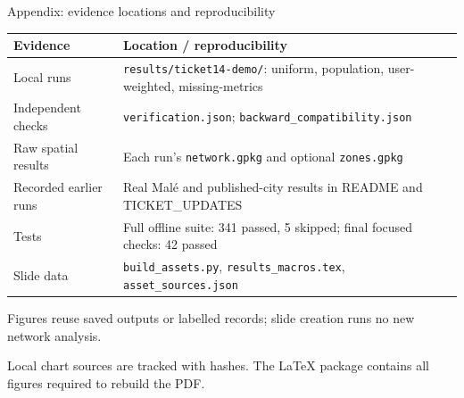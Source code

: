 \documentclass[11pt,aspectratio=169]{beamer}
\newcommand{\src}[1]{\vfill{\fontsize{7.5}{9}\selectfont\color{Muted}#1\par}}
\begin{document}
\begin{frame}{Appendix: evidence locations and reproducibility}
\small
\renewcommand{\arraystretch}{1.15}
\begin{tabular}{P{3.5cm}P{9.5cm}}
\toprule\textbf{Evidence} & \textbf{Location / reproducibility}\\\midrule
Local runs & \texttt{results/ticket14-demo/}: uniform, population, user-weighted, missing-metrics\\
Independent checks & \texttt{verification.json}; \texttt{backward\_compatibility.json}\\
Raw spatial results & Each run's \texttt{network.gpkg} and optional \texttt{zones.gpkg}\\
Recorded earlier runs & Real Mal\'e and published-city results in README and TICKET\_UPDATES\\
Tests & Full offline suite: 341 passed, 5 skipped; final focused checks: 42 passed\\
Slide data & \texttt{build\_assets.py}, \texttt{results\_macros.tex}, \texttt{asset\_sources.json}\\
\bottomrule
\end{tabular}
\vspace{3mm}
\small Figures reuse saved outputs or labelled records; slide creation runs no new network analysis.
\src{Local chart sources are tracked with hashes. The LaTeX package contains all figures required to rebuild the PDF.}
\end{frame}
\end{document}
